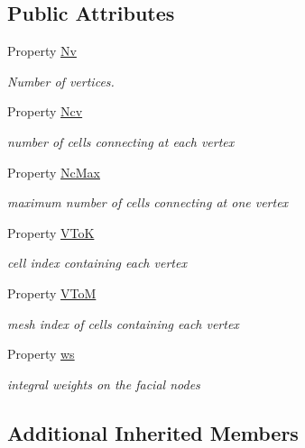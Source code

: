\subsection*{Public Attributes}
\begin{DoxyCompactItemize}
\item 
Property \hyperlink{class_ndg_b_j_abstract_aa67a9fb0e77dc278d9ad952ac26c4c8f}{Nv}
\begin{DoxyCompactList}\small\item\em Number of vertices. \end{DoxyCompactList}\item 
Property \hyperlink{class_ndg_b_j_abstract_a264833d1a3f0f5059ac81085858e8efc}{Ncv}
\begin{DoxyCompactList}\small\item\em number of cells connecting at each vertex \end{DoxyCompactList}\item 
Property \hyperlink{class_ndg_b_j_abstract_a8242aa4c52403f7f2ad1429b62bf98cc}{Nc\+Max}
\begin{DoxyCompactList}\small\item\em maximum number of cells connecting at one vertex \end{DoxyCompactList}\item 
Property \hyperlink{class_ndg_b_j_abstract_ad4c7ef882a4065f2e7cad28eb37ed56a}{V\+ToK}
\begin{DoxyCompactList}\small\item\em cell index containing each vertex \end{DoxyCompactList}\item 
Property \hyperlink{class_ndg_b_j_abstract_a8f549dce5b788e8b7552e134bdcd3c4e}{V\+ToM}
\begin{DoxyCompactList}\small\item\em mesh index of cells containing each vertex \end{DoxyCompactList}\item 
Property \hyperlink{class_ndg_b_j_abstract_ac5f3dac034e7861f44ed9627279970c4}{ws}
\begin{DoxyCompactList}\small\item\em integral weights on the facial nodes \end{DoxyCompactList}\end{DoxyCompactItemize}
\subsection*{Additional Inherited Members}


